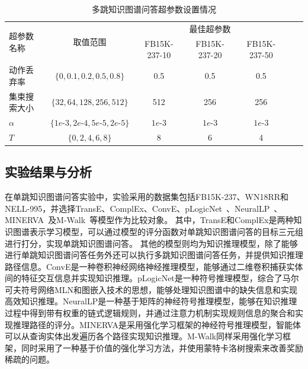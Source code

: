 \documentclass[algorithmlist, AutoFakeBold, AutoFakeSlant, figurelist, tablelist, nomlist, engineering]{seuthesix}
\begin{document}
\begin{table}[]
  \centering
  \begin{tabular*}{0.95\textwidth}{@{\extracolsep{\fill}}lcccccc}
  \toprule[1pt]
  \multirow{2}{*}{超参数名称} & \multirow{2}{*}{取值范围} & \multicolumn{3}{c}{最佳超参数}\\ 
    &  & \small{FB15K-237-10} & \small{FB15K-237-20} & \small{FB15K-237-50} \\ \hline
  动作丢弃率 & $\{0, 0.1, 0.2, 0.5, 0.8\}$ & 0.5 & 0.5 & 0.5 \\
  集束搜索大小 & $\{32, 64, 128, 256, 512\}$ & 512 & 256 & 256 \\
  $\alpha$ & $\{1e\text{-}3, 2e\text{-}4, 5e\text{-}5, 2e\text{-}5\}$ & $1e\text{-}3$ & $1e\text{-}3$ & $1e\text{-}3$ \\
  $T$ & $\{0, 2, 4, 6, 8\}$ & 8 & 6 & 4 \\
  \bottomrule[1pt]
  \end{tabular*}
  \caption{多跳知识图谱问答超参数设置情况}
  \label{Hyperparameters2_Multihop}
\end{table}


\subsection{实验结果与分析}
在单跳知识图谱问答实验中，实验采用的数据集包括FB15K-237、WN18RR和NELL-995，并选择TransE、ComplEx、ConvE、pLogicNet~\cite{qu2019probabilistic}、NeuralLP~\cite{yang2017differentiable}、MINERVA~\cite{das2018go}及M-Walk~\cite{shen2018m}等模型作为比较对象。
其中，TransE和ComplEx是两种知识图谱表示学习模型，可以通过模型的评分函数对单跳知识图谱问答的目标三元组进行打分，实现单跳知识图谱问答。
其他的模型则均为知识推理模型，除了能够进行单跳知识图谱问答任务外还可以执行多跳知识图谱问答任务，并提供知识推理路径信息。ConvE是一种卷积神经网络神经推理模型，能够通过二维卷积捕获实体间的特征交互信息并实现知识推理。pLogicNet是一种符号推理模型，综合了马尔可夫符号网络MLN和图嵌入技术的思想，能够处理知识图谱中的缺失信息和实现高效知识推理。NeuralLP是一种基于矩阵的神经符号推理模型，能够在知识推理过程中得到带有权重的链式逻辑规则，并通过注意力机制实现规则信息的聚合和实现推理路径的评分。MINERVA是采用强化学习框架的神经符号推理模型，智能体可以从查询实体出发遍历各个路径实现知识推理。M-Walk同样采用强化学习框架，同时采用了一种基于价值的强化学习方法，并使用蒙特卡洛树搜索来改善奖励稀疏的问题。
\end{document}
